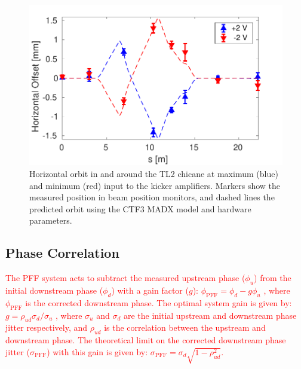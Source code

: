 \documentclass[%
 reprint,
superscriptaddress,
 amsmath,amssymb,
 prl,
]{revtex4-1}
\begin{document}
\begin{figure}
	\includegraphics[width=\columnwidth]{figs/orbClos}
	\caption{\label{fig:orbClos}Horizontal orbit in and around the TL2 chicane 
	at maximum (blue) and 
	minimum (red) 
	input to the kicker amplifiers. Markers show the measured position in beam 
	position monitors, and dashed lines the predicted orbit using the 
	CTF3 MADX model and hardware parameters.}
\end{figure}


\subsection{\label{ss:r56} Phase Correlation}

\textcolor{red}{The PFF system acts to subtract the measured upstream phase 
(\(\phi_u\)) from 
the initial downstream phase (\(\phi_d\)) with a gain factor (\(g\)):
\(\phi_{\mathrm{PFF}} = \phi_d - g\phi_u\)
, where \(\phi_{\mathrm{PFF}}\) is the corrected downstream phase. The optimal 
system gain is given by:
\(g = \rho_{ud} \sigma_d/\sigma_u\)
, where \(\sigma_u\) and \(\sigma_d\) are the initial upstream and downstream 
phase jitter respectively, and \(\rho_{ud}\) is the correlation between the 
upstream and downstream phase. The theoretical limit on the corrected 
downstream phase jitter (\(\sigma_{\mathrm{PFF}}\)) with this gain is given by:
\(\sigma_{\mathrm{PFF}}=\sigma_d \sqrt{1-\rho_{ud}^2}\).}
\end{document}
